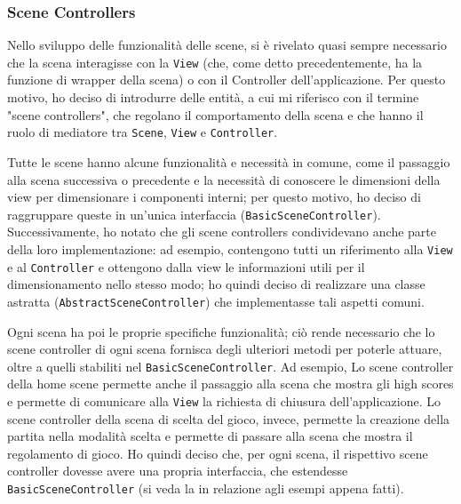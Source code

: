 \documentclass[a4paper,12pt]{report}
\begin{document}
\subsubsection{Scene Controllers}

Nello sviluppo delle funzionalità delle scene, si è rivelato quasi sempre necessario che la scena interagisse con la \texttt{View} (che, come detto precedentemente, ha la funzione di wrapper della scena) o con il Controller dell'applicazione. Per questo motivo, ho deciso di introdurre delle entità, a cui mi riferisco con il termine "scene controllers", che regolano il comportamento della scena e che hanno il ruolo di mediatore tra \texttt{Scene}, \texttt{View} e \texttt{Controller}.

Tutte le scene hanno alcune funzionalità e necessità in comune, come il passaggio alla scena successiva o precedente e la necessità di conoscere le dimensioni della view per dimensionare i componenti interni; per questo motivo, ho deciso di raggruppare queste in un'unica interfaccia (\texttt{BasicSceneController}). Successivamente, ho notato che gli scene controllers condividevano anche parte della loro implementazione: ad esempio, contengono tutti un riferimento alla \texttt{View} e al \texttt{Controller} e ottengono dalla view le informazioni utili per il dimensionamento nello stesso modo; ho quindi deciso di realizzare una classe astratta (\texttt{AbstractSceneController}) che implementasse tali aspetti comuni.

Ogni scena ha poi le proprie specifiche funzionalità; ciò rende necessario che lo scene controller di ogni scena fornisca degli ulteriori metodi per poterle attuare, oltre a quelli stabiliti nel \texttt{BasicSceneController}. Ad esempio, Lo scene controller della home scene permette anche il passaggio alla scena che mostra gli high scores e permette di comunicare alla \texttt{View} la richiesta di chiusura dell'applicazione. Lo scene controller della scena di scelta del gioco, invece, permette la creazione della partita nella modalità scelta e permette di passare alla scena che mostra il regolamento di gioco. Ho quindi deciso che, per ogni scena, il rispettivo scene controller dovesse avere una propria interfaccia, che estendesse \texttt{BasicSceneController} (si veda la  in relazione agli esempi appena fatti). 
\end{document}
